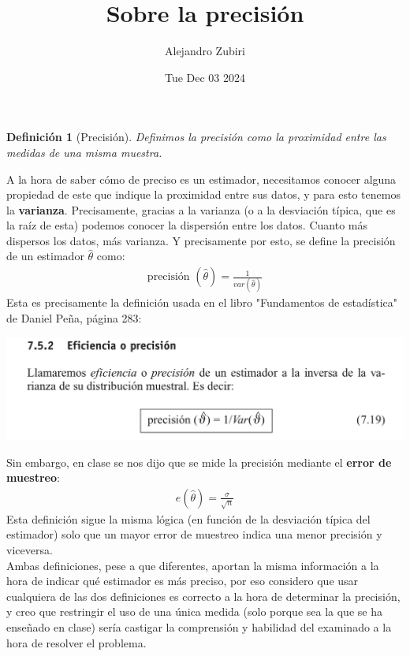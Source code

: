 \documentclass{article}
\author{Alejandro Zubiri}
\date{Tue Dec 03 2024}
\title{Sobre la precisión}
\newtheorem{definition}{Definición}
\begin{document}
\maketitle
\begin{definition}[Precisión]
    Definimos la precisión como la proximidad entre las medidas de una misma muestra.
\end{definition}
    A la hora de saber cómo de preciso es un estimador, necesitamos conocer alguna propiedad de este que
    indique la proximidad entre sus datos, y para esto tenemos la \textbf{varianza}. Precisamente, gracias
    a la varianza (o a la desviación típica, que es la raíz de esta) podemos conocer la dispersión 
    entre los datos. Cuanto más dispersos los datos, más varianza. Y precisamente por esto,
    se define la precisión de un estimador $\hat{\theta }$ como:
    \begin{equation}
        \begin{split}
            \text{precisión }(\hat{\theta }) = \frac{1}{var(\hat{\theta })}
        \end{split}
    \end{equation}
    Esta es precisamente la definición usada en el libro "Fundamentos de estadística" de Daniel Peña, página
    283:
    \begin{center}
        \includegraphics[scale=0.25]{20241203_164517000_iOS.jpg}
    \end{center}
    Sin embargo, en clase se nos dijo que se mide la precisión mediante el \textbf{error de muestreo}:
    \begin{equation}
        \begin{split}
            e(\hat{\theta }) = \frac{\sigma }{\sqrt{n}}
        \end{split}
    \end{equation}
    Esta definición sigue la misma lógica (en función de la desviación típica del estimador) solo que un
    mayor error de muestreo indica una menor precisión y viceversa.\\
    Ambas definiciones, pese a que diferentes, aportan la misma información a la hora de indicar qué
    estimador es más preciso, por eso considero que usar cualquiera de las dos definiciones es correcto
    a la hora de determinar la precisión, y creo que restringir el uso de una única medida
    (solo porque sea la que se ha enseñado en clase) sería castigar la comprensión y habilidad del
    examinado a la hora de resolver el problema.
\end{document}
